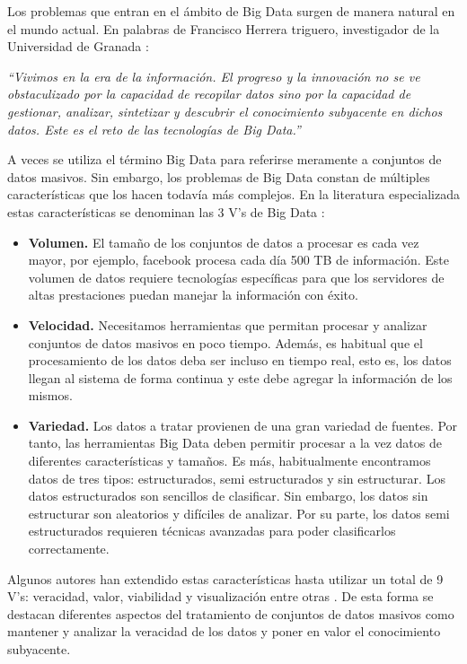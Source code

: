 \documentclass[10pt]{article}
\begin{document}
	Los problemas que entran en el ámbito de Big Data surgen de manera natural en el mundo actual. En palabras de Francisco Herrera triguero, investigador de la Universidad de Granada  \cite{big-data-herrera}:
	
	\textit{``Vivimos en la era de la información. El progreso y la innovación no se ve obstaculizado por la capacidad de recopilar datos sino por la capacidad de gestionar, analizar, sintetizar y descubrir el conocimiento subyacente en dichos datos. Este es el reto de las tecnologías de Big Data.''}
	
	A veces se utiliza el término Big Data para referirse meramente a conjuntos de datos masivos. Sin embargo, los problemas de Big Data constan de múltiples características que los hacen todavía más complejos. En la literatura especializada estas características se denominan las 3 V's de Big Data \cite{big-data}:

	\begin{itemize}
		\item \textbf{Volumen.} El tamaño de los conjuntos de datos a procesar es cada vez mayor, por ejemplo, facebook procesa cada día 500 TB de información. Este volumen de datos requiere tecnologías específicas para que los servidores de altas prestaciones puedan manejar la información con éxito.
		\item \textbf{Velocidad.} Necesitamos herramientas que permitan procesar y analizar conjuntos de datos masivos en poco tiempo. Además, es habitual que el procesamiento de los datos deba ser incluso en tiempo real, esto es, los datos llegan al sistema de forma continua y este debe agregar la información de los mismos.
		\item \textbf{Variedad.} Los datos a tratar provienen de una gran variedad de fuentes. Por tanto, las herramientas Big Data deben permitir procesar a la vez datos de diferentes características y tamaños. Es más, habitualmente encontramos datos de tres tipos: estructurados, semi estructurados y sin estructurar. Los datos estructurados son sencillos de clasificar. Sin embargo, los datos sin estructurar son aleatorios y difíciles de analizar. Por su parte, los datos semi estructurados requieren técnicas avanzadas para poder clasificarlos correctamente.
	\end{itemize}

	Algunos autores han extendido estas características hasta utilizar un total de 9 V's: veracidad, valor, viabilidad y visualización entre otras \cite{understanding-big-data}. De esta forma se destacan diferentes aspectos del tratamiento de conjuntos de datos masivos como mantener y analizar la veracidad de los datos y poner en valor el conocimiento subyacente.
\end{document}
